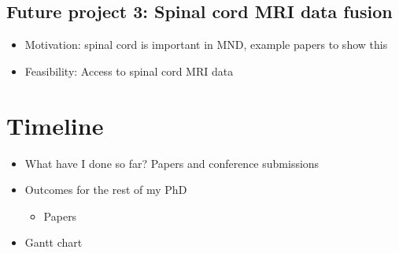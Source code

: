 \subsection{Future project 3: Spinal cord MRI data fusion}
\begin{itemize}
    \item Motivation: spinal cord is important in MND, example papers to show this
    \item Feasibility: Access to spinal cord MRI data
\end{itemize}

\section{Timeline}
\begin{itemize}
    \item What have I done so far? Papers and conference submissions
    \item Outcomes for the rest of my PhD
    \begin{itemize}
        \item Papers
    \end{itemize}
    \item Gantt chart
\end{itemize}
